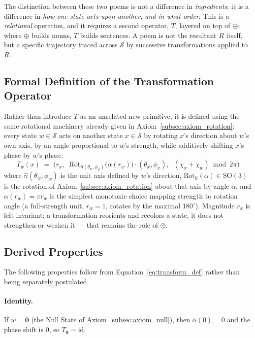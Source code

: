 \documentclass[12pt, a4paper]{article}
\begin{document}
The distinction between these two poems is not a difference in
\emph{ingredients}; it is a difference in \emph{how one state acts
upon another, and in what order}. This is a \emph{relational}
operation, and it requires a second operator, $T$, layered on top of
$\oplus$: where $\oplus$ builds nouns, $T$ builds sentences. A poem is
not the resultant $R$ itself, but a specific trajectory traced across
$\mathcal{S}$ by successive transformations applied to $R$.

\subsection{Formal Definition of the Transformation Operator}
\label{subsec:transform_definition}
Rather than introduce $T$ as an unrelated new primitive, it is defined
using the same rotational machinery already given in
Axiom~\ref{subsec:axiom_rotation}: every state $w \in \mathcal{S}$
acts on another state $x \in \mathcal{S}$ by rotating $x$'s direction
about $w$'s own axis, by an angle proportional to $w$'s strength, while
additively shifting $x$'s phase by $w$'s phase:
\begin{equation}
    T_w(x) \;=\; \Big(r_x,\;\; \mathrm{Rot}_{\hat n(\theta_w,\phi_w)}\!\big(\alpha(r_w)\big)\cdot(\theta_x,\phi_x),\;\; (\chi_x + \chi_w) \bmod 2\pi\Big)
    \label{eq:transform_def}
\end{equation}
where $\hat n(\theta_w,\phi_w)$ is the unit axis defined by $w$'s
direction, $\mathrm{Rot}_{\hat n}(\alpha) \in \mathrm{SO}(3)$ is the
rotation of Axiom~\ref{subsec:axiom_rotation} about that axis by angle
$\alpha$, and $\alpha(r_w) = \pi r_w$ is the simplest monotonic choice
mapping strength to rotation angle (a full-strength unit, $r_w = 1$,
rotates by the maximal $180^\circ$). Magnitude $r_x$ is left invariant:
a transformation reorients and recolors a state, it does not
strengthen or weaken it --- that remains the role of $\oplus$.

\subsection{Derived Properties}
\label{subsec:transform_properties}
The following properties follow from Equation~\eqref{eq:transform_def}
rather than being separately postulated.

\paragraph{Identity.} If $w = \mathbf{0}$ (the Null State of
Axiom~\ref{subsec:axiom_null}), then $\alpha(0) = 0$ and the phase
shift is $0$, so $T_{\mathbf{0}} = \mathrm{id}$.
\end{document}
